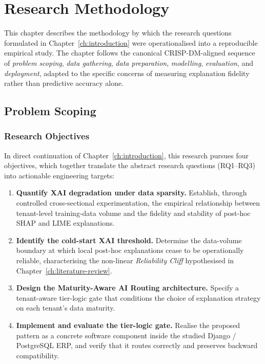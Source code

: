 \chapter{Research Methodology}
\label{ch:methodology}

This chapter describes the methodology by which the research questions
formulated in Chapter~\ref{ch:introduction} were operationalised into a
reproducible empirical study. The chapter follows the canonical
CRISP-DM-aligned sequence of \emph{problem scoping}, \emph{data gathering},
\emph{data preparation}, \emph{modelling}, \emph{evaluation}, and
\emph{deployment}, adapted to the specific concerns of measuring explanation
fidelity rather than predictive accuracy alone.

\section{Problem Scoping}
\label{sec:problem-scoping}

\subsection{Research Objectives}
\label{subsec:meth-objectives}

In direct continuation of Chapter~\ref{ch:introduction}, this research pursues
four objectives, which together translate the abstract research questions
(RQ1--RQ3) into actionable engineering targets:

\begin{enumerate}
    \item \textbf{Quantify XAI degradation under data sparsity.} Establish,
    through controlled cross-sectional experimentation, the empirical
    relationship between tenant-level training-data volume and the fidelity
    and stability of post-hoc SHAP and LIME explanations.
    \item \textbf{Identify the cold-start XAI threshold.} Determine the
    data-volume boundary at which local post-hoc explanations cease to be
    operationally reliable, characterising the non-linear \emph{Reliability
    Cliff} hypothesised in Chapter~\ref{ch:literature-review}.
    \item \textbf{Design the Maturity-Aware AI Routing architecture.} Specify
    a tenant-aware tier-logic gate that conditions the choice of explanation
    strategy on each tenant's data maturity.
    \item \textbf{Implement and evaluate the tier-logic gate.} Realise the
    proposed pattern as a concrete software component inside the studied
    Django / PostgreSQL ERP, and verify that it routes correctly and preserves
    backward compatibility.
\end{enumerate}

